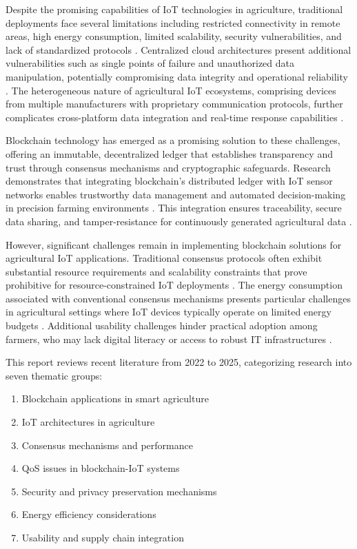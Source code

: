 \documentclass[12pt,onecolumn]{IEEEtran} %
\begin{document}
Despite the promising capabilities of IoT technologies in agriculture, traditional deployments face several limitations including restricted connectivity in remote areas, high energy consumption, limited scalability, security vulnerabilities, and lack of standardized protocols \cite{bayih2022utilizationofinternet, quy2022iotenabledsmartagriculture, jaliyagoda2023internetofthings}. Centralized cloud architectures present additional vulnerabilities such as single points of failure and unauthorized data manipulation, potentially compromising data integrity and operational reliability \cite{aliyu2023blockchainbasedsmartfarm}. The heterogeneous nature of agricultural IoT ecosystems, comprising devices from multiple manufacturers with proprietary communication protocols, further complicates cross-platform data integration and real-time response capabilities \cite{irfan2025aniotdrivensmart, abdurrohim2024blockchainbasedframeworkfor}.

Blockchain technology has emerged as a promising solution to these challenges, offering an immutable, decentralized ledger that establishes transparency and trust through consensus mechanisms and cryptographic safeguards. Research demonstrates that integrating blockchain's distributed ledger with IoT sensor networks enables trustworthy data management and automated decision-making in precision farming environments \cite{aliyu2023blockchainbasedsmartfarm, ellahi2023blockchainbasedframeworksfor}. This integration ensures traceability, secure data sharing, and tamper-resistance for continuously generated agricultural data \cite{daund2025designofan}.

However, significant challenges remain in implementing blockchain solutions for agricultural IoT applications. Traditional consensus protocols often exhibit substantial resource requirements and scalability constraints that prove prohibitive for resource-constrained IoT deployments \cite{akella2023asystematicreview, mwewa2024blockchaintechnologya}. The energy consumption associated with conventional consensus mechanisms presents particular challenges in agricultural settings where IoT devices typically operate on limited energy budgets \cite{ninsiima2025determinantsofsmallholder}. Additional usability challenges hinder practical adoption among farmers, who may lack digital literacy or access to robust IT infrastructures \cite{mwewa2024blockchaintechnologya}.

This report reviews recent literature from 2022 to 2025, categorizing research into seven thematic groups:
\begin{enumerate}
    \item Blockchain applications in smart agriculture
    \item IoT architectures in agriculture
    \item Consensus mechanisms and performance
    \item QoS issues in blockchain-IoT systems
    \item Security and privacy preservation mechanisms
    \item Energy efficiency considerations
    \item Usability and supply chain integration
\end{enumerate}
\end{document}
